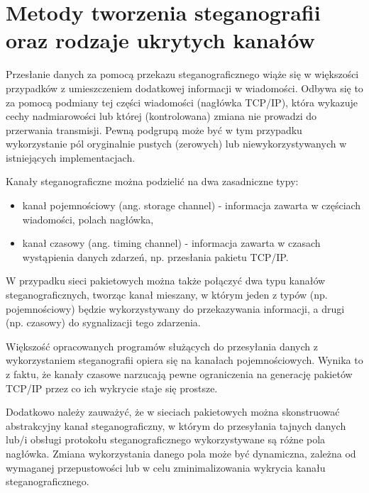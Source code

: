 \documentclass[a4paper,12pt,twoside,openany]{report}
\begin{document}
\section{Metody tworzenia steganografii oraz rodzaje ukrytych kanałów}
Przesłanie danych za pomocą przekazu steganograficznego wiąże się w większości przypadków z umieszczeniem dodatkowej informacji w wiadomości. Odbywa się to za pomocą podmiany tej części wiadomości (nagłówka TCP/IP), która wykazuje cechy nadmiarowości lub której (kontrolowana) zmiana nie prowadzi do przerwania transmisji. Pewną podgrupą może być w tym przypadku wykorzystanie pól oryginalnie pustych (zerowych) lub niewykorzystywanych w istniejących implementacjach.

Kanały steganograficzne można podzielić na dwa zasadniczne typy\cite{SweetyPresentation}:
\begin{itemize}
	\item kanał pojemnościowy (ang. storage channel) - informacja zawarta w częściach wiadomości, polach nagłówka,
	\item kanał czasowy (ang. timing channel) - informacja zawarta w czasach wystąpienia danych zdarzeń, np. przesłania pakietu TCP/IP.
\end{itemize}
W przypadku sieci pakietowych można także połączyć dwa typu kanałów steganograficznych, tworząc kanał mieszany, w którym jeden z typów (np. pojemnościowy) będzie wykorzystywany do przekazywania informacji, a drugi (np. czasowy) do sygnalizacji tego zdarzenia.

Większość opracowanych programów służących do przesyłania danych z wykorzystaniem steganografii opiera się na kanałach pojemnościowych. Wynika to z faktu, że kanały czasowe narzucają pewne ograniczenia na generację pakietów TCP/IP przez co ich wykrycie staje się prostsze.

Dodatkowo należy zauważyć, że w sieciach pakietowych można skonstruować abstrakcyjny kanał steganograficzny, w którym do przesyłania tajnych danych lub/i obsługi protokołu steganograficznego wykorzystywane są różne pola nagłówka. Zmiana wykorzystania danego pola może być dynamiczna, zależna od wymaganej przepustowości lub w celu zminimalizowania wykrycia kanału steganograficznego. 
\end{document}

